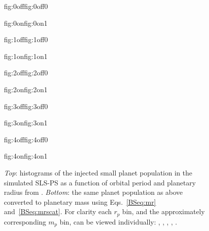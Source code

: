 \begin{figure}
  \centering
  \hspace{-\hsize}%
  \begin{ocg}{fig:0off}{fig:0off}{0}%
  \end{ocg}%
  \begin{ocg}{fig:0on}{fig:0on}{1}%
  \end{ocg}
  \hspace{-\hsize}%
  \begin{ocg}{fig:1off}{fig:1off}{0}%
  \end{ocg}%
  \begin{ocg}{fig:1on}{fig:1on}{1}%
  \end{ocg}
  \hspace{-\hsize}%
  \begin{ocg}{fig:2off}{fig:2off}{0}%
  \end{ocg}%
  \begin{ocg}{fig:2on}{fig:2on}{1}%
  \end{ocg}
  \hspace{-\hsize}%
    \begin{ocg}{fig:3off}{fig:3off}{0}%
  \end{ocg}%
  \begin{ocg}{fig:3on}{fig:3on}{1}%
  \end{ocg}
  \hspace{-\hsize}%
    \begin{ocg}{fig:4off}{fig:4off}{0}%
  \end{ocg}%
  \begin{ocg}{fig:4on}{fig:4on}{1}%
  \end{ocg}
  \hspace{-\hsize}%
  \caption{\emph{Top}: histograms of the injected small planet population in the simulated SLS-PS
    as a function of orbital period and planetary radius from \cite{dressing15a}. \emph{Bottom}:
    the same planet population as above converted to planetary mass using Eqs.~\ref{BSeq:mr}
    and~\ref{BSeq:mrscat}. For clarity each $r_p$ bin, and the approximately corresponding
    $m_p$ bin, can be viewed individually:
    ,
    ,
    ,
    ,
    .}
  \label{BSfig:occurrence}
\end{figure}

